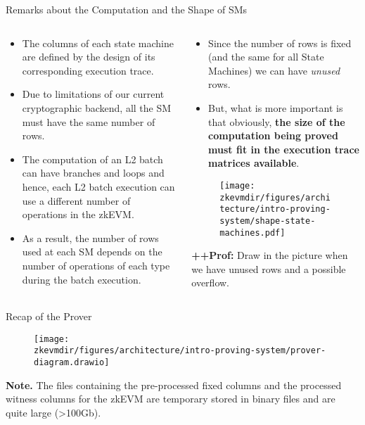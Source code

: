 \begin{frame}{Remarks about the Computation and the Shape of SMs}
\begin{columns}
\begin{column}{0.48 \textwidth}
\begin{itemize}
\small
\item The columns of each state machine are defined by
the design of its corresponding execution trace.
\item Due to limitations of our current cryptographic backend, all the SM must have the same number of rows.
\item The computation of an L2 batch can have branches and loops and hence, 
each L2 batch execution can use a different number of operations in the zkEVM.
\item As a result, the number of rows used at each SM depends on the
number of operations of each type during the batch execution.
\end{itemize}
\end{column}

\begin{column}{0.5 \textwidth}
\begin{itemize}
\small
\item Since the number of rows is fixed (and the same for all State Machines) we
can have \textit{unused} rows.
\item But, what is more important is that obviously, \textbf{the size of the computation being proved must fit 
in the execution trace matrices available}.
\end{itemize}
\begin{figure}
\texttt{[image: \\zkevmdir/figures/architecture/intro-proving-system/shape-state-machines.pdf]}
\end{figure}

\ifPROF
\vspace{0.2cm}
\scriptsize
\textbf{++Prof:} Draw in the picture when we have unused rows and a possible overflow.
\normalsize
\fi

\end{column}
\end{columns}
\end{frame}





\begin{frame} {Recap of the Prover}
\begin{figure}
\centering
\texttt{[image: \\zkevmdir/figures/architecture/intro-proving-system/prover-diagram.drawio]}
\end{figure}

\footnotesize
\textbf{Note.} The files containing the pre-processed fixed columns and the processed witness columns for the zkEVM are temporary stored in binary files and are quite large (>100Gb).
\end{frame}



